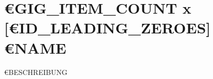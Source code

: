 \documentclass[../list/inventory_full.tex]{subfiles}
\begin{document}

\section*{€{GIG_ITEM_COUNT} x [€{ID_LEADING_ZEROES}] €{NAME}}
€{BESCHREIBUNG}
\end{document}

